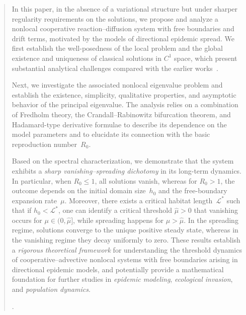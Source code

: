 \documentclass[a4paper,11pt]{amsart}
\theoremstyle{definition}
\numberwithin{equation}{section}
\theoremstyle{definition}
\begin{document}
\begin{abstract}
In this paper, in the absence of a variational structure but under sharper regularity requirements on the solutions, we propose and analyze a nonlocal cooperative reaction--diffusion system with free boundaries and drift terms,  motivated by the models of directional epidemic spread. We first establish the well-posedness of the local problem and the global existence and uniqueness of classical solutions in $C^1$ space, which present substantial analytical challenges compared with the earlier works~\cite{Du,Berestycki2016a,Berestycki2016b,Cao2019,NguyenVo2022,Tang2024a,Tang2024b}.

Next, we investigate the associated nonlocal eigenvalue problem and establish the existence, simplicity, qualitative properties, and asymptotic behavior of the principal eigenvalue.
The analysis relies on a combination of Fredholm theory, the Crandall–Rabinowitz bifurcation theorem, and Hadamard-type derivative formulae to describe its dependence on the model parameters and to elucidate its connection with the basic reproduction number~$R_0$.


Based on the spectral characterization, we demonstrate that the system exhibits a \emph{sharp vanishing--spreading dichotomy} in its long-term dynamics.
In particular, when $R_0 \le 1$, all solutions vanish, whereas for $R_0 > 1$, the outcome depends on the initial domain size~$h_0$ and the free-boundary expansion rate~$\mu$.
Moreover, there exists a critical habitat length~$\mathcal L^\ast$ such that if $h_0 < \mathcal L^\ast$, one can identify a critical threshold $\widehat{\mu}>0$  that vanishing occurs for $\mu \in (0,\widehat{\mu}]$, while spreading happens for $\mu > \widehat{\mu}$. In the spreading regime, solutions converge to the unique positive steady state, whereas in the vanishing regime they decay uniformly to zero. These results establish a \emph{rigorous theoretical framework} for understanding the threshold dynamics of cooperative--advective nonlocal systems with free boundaries arising in directional epidemic models, and potentially provide a mathematical foundation for further studies in \emph{epidemic modeling}, \emph{ecological invasion}, and \emph{population dynamics}.

.



\end{abstract}


\end{document}

